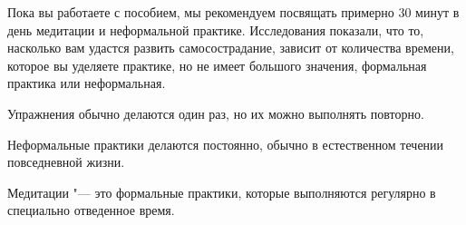	Пока вы работаете с пособием, мы рекомендуем посвящать примерно 30 минут в день медитации и неформальной практике. Исследования показали, что то, насколько вам удастся развить самосострадание, зависит от количества времени, которое вы уделяете практике, но не имеет большого значения, формальная практика или неформальная.  
	
	Упражнения обычно делаются один раз, но их можно выполнять повторно.
	
	Неформальные практики делаются постоянно, обычно в естественном течении повседневной жизни.
	
	Медитации "--- это формальные практики, которые выполняются регулярно в специально отведенное время. 
	